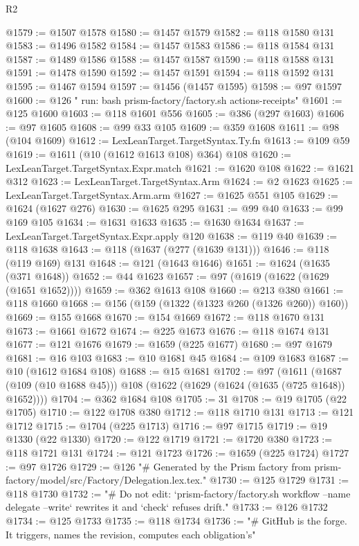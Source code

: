 \begin{lexlean}{R2}
\begin{coremodule}
@1579 := @1507 @1578
@1580 := @1457 @1579
@1582 := @118 @1580 @131
@1583 := @1496 @1582
@1584 := @1457 @1583
@1586 := @118 @1584 @131
@1587 := @1489 @1586
@1588 := @1457 @1587
@1590 := @118 @1588 @131
@1591 := @1478 @1590
@1592 := @1457 @1591
@1594 := @118 @1592 @131
@1595 := @1467 @1594
@1597 := @1456 (@1457 @1595)
@1598 := @97 @1597
@1600 := @126 "        run: bash prism-factory/factory.sh actions-receipts"
@1601 := @125 @1600
@1603 := @118 @1601 @556
@1605 := @386 (@297 @1603)
@1606 := @97 @1605
@1608 := @99 @33 @105
@1609 := @359 @1608
@1611 := @98 (@104 @1609)
@1612 := LexLeanTarget.TargetSyntax.Ty.fn
@1613 := @109 @59
@1619 := @1611 (@10 (@1612 @1613 @108) @364) @108
@1620 := LexLeanTarget.TargetSyntax.Expr.match
@1621 := @1620 @108
@1622 := @1621 @312
@1623 := LexLeanTarget.TargetSyntax.Arm
@1624 := @2 @1623
@1625 := LexLeanTarget.TargetSyntax.Arm.arm
@1627 := @1625 @551 @105
@1629 := @1624 (@1627 @276)
@1630 := @1625 @295
@1631 := @99 @40
@1633 := @99 @169 @105
@1634 := @1631 @1633
@1635 := @1630 @1634
@1637 := LexLeanTarget.TargetSyntax.Expr.apply @120
@1638 := @119 @40
@1639 := @118 @1638
@1643 := @118 (@1637 (@277 (@1639 @131)))
@1646 := @118 (@119 @169) @131
@1648 := @121 (@1643 @1646)
@1651 := @1624 (@1635 (@371 @1648))
@1652 := @44 @1623
@1657 := @97 (@1619 (@1622 (@1629 (@1651 @1652))))
@1659 := @362 @1613 @108
@1660 := @213 @380
@1661 := @118 @1660
@1668 := @156 (@159 (@1322 (@1323 @260 (@1326 @260)) @160))
@1669 := @155 @1668
@1670 := @154 @1669
@1672 := @118 @1670 @131
@1673 := @1661 @1672
@1674 := @225 @1673
@1676 := @118 @1674 @131
@1677 := @121 @1676
@1679 := @1659 (@225 @1677)
@1680 := @97 @1679
@1681 := @16 @103
@1683 := @10 @1681 @45
@1684 := @109 @1683
@1687 := @10 (@1612 @1684 @108)
@1688 := @15 @1681
@1702 := @97
    (@1611 (@1687 (@109 (@10 @1688 @45))) @108 (@1622 (@1629 (@1624 (@1635 (@725 @1648)) @1652))))
@1704 := @362 @1684 @108
@1705 := 31
@1708 := @19 @1705 (@22 @1705)
@1710 := @122 @1708 @380
@1712 := @118 @1710 @131
@1713 := @121 @1712
@1715 := @1704 (@225 @1713)
@1716 := @97 @1715
@1719 := @19 @1330 (@22 @1330)
@1720 := @122 @1719
@1721 := @1720 @380
@1723 := @118 @1721 @131
@1724 := @121 @1723
@1726 := @1659 (@225 @1724)
@1727 := @97 @1726
@1729 := @126
    "# Generated by the Prism factory from prism-factory/model/src/Factory/Delegation.lex.tex."
@1730 := @125 @1729
@1731 := @118 @1730
@1732 := "# Do not edit: `prism-factory/factory.sh workflow --name delegate --write` rewrites it and `check` refuses drift."
@1733 := @126 @1732
@1734 := @125 @1733
@1735 := @118 @1734
@1736 := "# GitHub is the forge. It triggers, names the revision, computes each obligation's"

\end{coremodule}
\end{lexlean}
